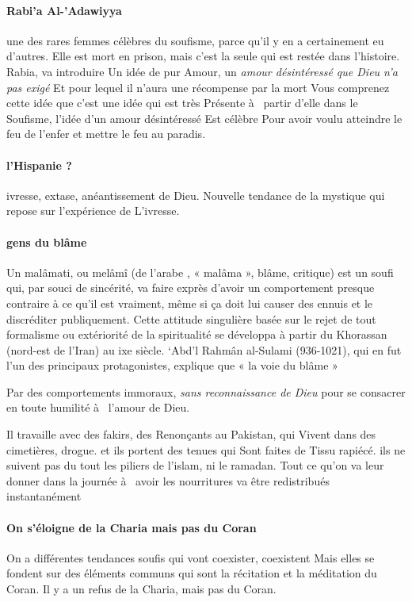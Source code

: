 \paragraph{Rabi'a Al-'Adawiyya} 
une des rares femmes célèbres du soufisme, parce qu'il y en a certainement eu d'autres. 
Elle est mort en prison, mais c'est la 
seule 
qui  est restée dans l'histoire.
Rabia,   va introduire 
Un idée de pur 
Amour, un \textit{amour désintéressé que Dieu n'a pas 
exigé }
Et pour lequel il n'aura une récompense par la mort 
Vous comprenez cette idée que c'est une idée qui  est très 
Présente à  partir d'elle dans le 
Soufisme, l'idée d'un amour désintéressé 
Est célèbre 
Pour avoir voulu 
atteindre 
le feu de l'enfer et mettre le feu au paradis. 


\paragraph{l'Hispanie ?} ivresse, extase, anéantissement de Dieu. 
Nouvelle tendance de la mystique qui  repose sur l'expérience de 
L'ivresse.

\paragraph{gens du blâme}
Un malâmati, ou melâmî  (de l’arabe  
 , « malâma », blâme, critique) est un soufi qui, par souci de sincérité, va faire exprès d’avoir un comportement presque contraire à ce qu’il est vraiment, même si ça doit lui causer des ennuis et le discréditer publiquement. Cette attitude singulière basée sur le rejet de tout formalisme ou extériorité de la spiritualité se développa à partir du Khorassan (nord-est de l’Iran) au ixe siècle. ‘Abd’l Rahmân al-Sulami (936-1021), qui en fut l'un des principaux protagonistes, explique que « la voie du blâme »
 
Par des comportements 
immoraux, \textit{sans reconnaissance de Dieu} pour se consacrer en 
toute humilité à  
l'amour de Dieu. 
 
\begin{Ex}
Il travaille avec des fakirs, des 
Renonçants au Pakistan, qui  
Vivent dans des cimetières, drogue. et ils portent des tenues qui  
Sont faites de 
Tissu rapiécé. ils ne suivent pas du 
tout  les piliers de l'islam, ni le  ramadan. 
  Tout ce qu'on va leur donner dans la journée à  avoir les nourritures va être redistribués instantanément   
\end{Ex}

\paragraph{On s'éloigne de la Charia mais pas du Coran}
On a différentes 
tendances 
soufis qui  vont coexister, coexistent 
Mais elles se fondent sur 
des éléments 
communs qui  sont la récitation et 
la méditation 
du Coran. Il y a un refus de la 
Charia, mais pas du 
Coran.  
